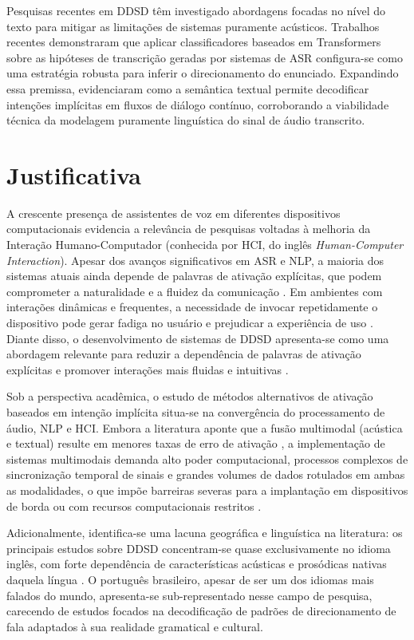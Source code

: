 \documentclass[
    12pt,                %
    openright,           %
    oneside,             %
    a4paper,             %
    english,             %
    brazil               %
]{abntex2}
\begin{document}
Pesquisas recentes em DDSD têm investigado abordagens focadas no nível do texto para mitigar as limitações de sistemas puramente acústicos. Trabalhos recentes \cite{Wagner2024, Dighe2024} demonstraram que aplicar classificadores baseados em Transformers sobre as hipóteses de transcrição geradas por sistemas de ASR configura-se como uma estratégia robusta para inferir o direcionamento do enunciado. Expandindo essa premissa,  evidenciaram como a semântica textual permite decodificar intenções implícitas em fluxos de diálogo contínuo, corroborando a viabilidade técnica da modelagem puramente linguística do sinal de áudio transcrito.

\section{Justificativa}
\label{sec:justificativa}

A crescente presença de assistentes de voz em diferentes dispositivos computacionais evidencia a relevância de pesquisas voltadas à melhoria da Interação Humano-Computador (conhecida por HCI, do inglês \textit{Human-Computer Interaction}). Apesar dos avanços significativos em ASR e NLP, a maioria dos sistemas atuais ainda depende de palavras de ativação explícitas, que podem comprometer a naturalidade e a fluidez da comunicação \cite{Mallidi2018}. Em ambientes com interações dinâmicas e frequentes, a necessidade de invocar repetidamente o dispositivo pode gerar fadiga no usuário e prejudicar a experiência de uso \cite{Nie2021}. Diante disso, o desenvolvimento de sistemas de DDSD apresenta-se como uma abordagem relevante para reduzir a dependência de palavras de ativação explícitas e promover interações mais fluidas e intuitivas \cite{Wagner2024}.

Sob a perspectiva acadêmica, o estudo de métodos alternativos de ativação baseados em intenção implícita situa-se na convergência do processamento de áudio, NLP e HCI. Embora a literatura aponte que a fusão multimodal (acústica e textual) resulte em menores taxas de erro de ativação \cite{Wagner2024}, a implementação de sistemas multimodais demanda alto poder computacional, processos complexos de sincronização temporal de sinais e grandes volumes de dados rotulados em ambas as modalidades, o que impõe barreiras severas para a implantação em dispositivos de borda ou com recursos computacionais restritos \cite{Xu2024}.

Adicionalmente, identifica-se uma lacuna geográfica e linguística na literatura: os principais estudos sobre DDSD concentram-se quase exclusivamente no idioma inglês, com forte dependência de características acústicas e prosódicas nativas daquela língua \cite{Norouzian2019, Krishna2023}. O português brasileiro, apesar de ser um dos idiomas mais falados do mundo, apresenta-se sub-representado nesse campo de pesquisa, carecendo de estudos focados na decodificação de padrões de direcionamento de fala adaptados à sua realidade gramatical e cultural.
\end{document}

